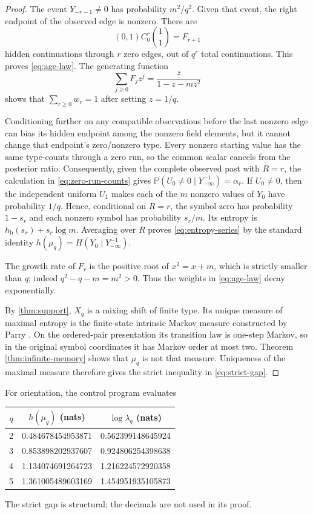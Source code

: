 \documentclass[11pt,a4paper]{amsart}
\theoremstyle{definition}
\theoremstyle{remark}
\newcommand{\Prob}{\mathbb P}
\newcommand{\hb}{h_{\mathrm b}}
\begin{document}
\begin{proof}
The event $Y_{-r-1}\ne0$ has probability $m^2/q^2$.  Given that event,
the right endpoint of the observed edge is nonzero.  There are
\[
 (0,1)C_0^r\binom11=F_{r+1}
\]
hidden continuations through $r$ zero edges, out of $q^r$ total
continuations.  This proves \eqref{eq:age-law}.  The generating function
\begin{equation}\label{eq:F-generating}
 \sum_{j\geq0}F_jz^j=\frac{z}{1-z-mz^2}
\end{equation}
shows that $\sum_{r\geq0}w_r=1$ after setting $z=1/q$.

Conditioning further on any compatible observations before the last nonzero
edge can bias its hidden endpoint among the nonzero field elements, but it
cannot change that endpoint's zero/nonzero type.  Every nonzero starting value
has the same type-counts through a zero run, so the common scalar cancels from
the posterior ratio.  Consequently, given the complete observed past with
$R=r$, the calculation in \eqref{eq:zero-run-counts} gives
$\Prob(U_0\ne0\mid Y_{-\infty}^{-1})=\alpha_r$.  If $U_0\ne0$, then the
independent uniform $U_1$ makes each of the $m$ nonzero values of $Y_0$
have probability $1/q$.  Hence, conditional on $R=r$, the symbol zero has
probability $1-s_r$ and each nonzero symbol has probability $s_r/m$.
Its entropy is $\hb(s_r)+s_r\log m$.  Averaging over $R$ proves
\eqref{eq:entropy-series} by the standard identity
$h(\mu_q)=H(Y_0\mid Y_{-\infty}^{-1})$.

The growth rate of $F_r$ is the positive root of $x^2=x+m$, which is
strictly smaller than $q$; indeed $q^2-q-m=m^2>0$.  Thus the weights in
\eqref{eq:age-law} decay exponentially.

By \cref{thm:support}, $X_q$ is a mixing shift of finite type.  Its unique
measure of maximal entropy is the finite-state intrinsic Markov measure
constructed by Parry \cite{Parry1964}.  On the ordered-pair presentation its
transition law is one-step Markov, so in the original symbol coordinates it
has Markov order at most two.  Theorem \ref{thm:infinite-memory} shows that
$\mu_q$ is not that measure.  Uniqueness of the maximal measure therefore
gives the strict inequality in \eqref{eq:strict-gap}.
\end{proof}

For orientation, the control program evaluates
\begin{center}
\begin{tabular}{c@{\qquad}cc}
\toprule
$q$ & $h(\mu_q)$ (nats) & $\log\lambda_q$ (nats)\\
\midrule
2 & 0.484678454953871 & 0.562399148645924\\
3 & 0.853898202937607 & 0.924806254398638\\
4 & 1.134074691264723 & 1.216224572920358\\
5 & 1.361005489603169 & 1.454951935105873\\
\bottomrule
\end{tabular}
\end{center}
The strict gap is structural; the decimals are not used in its proof.
\end{document}
